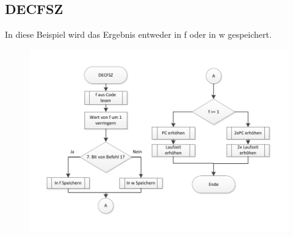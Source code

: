 \subsection{DECFSZ}
In diese Beispiel wird das Ergebnis entweder in f oder in w gespeichert.

\begin{figure}[h]
\centering
\includegraphics[scale=0.6]{Diag/DECFSZ.pdf}
\end{figure}

